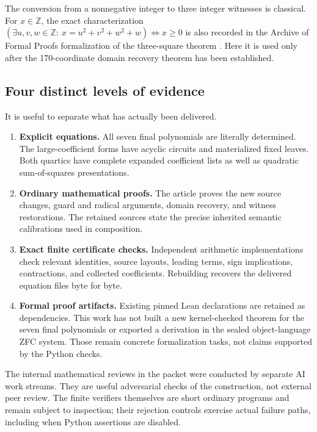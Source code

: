 \documentclass[11pt,a4paper]{article}
\theoremstyle{definition}
\begin{document}
The conversion from a nonnegative integer to three integer witnesses is
classical. For $x\in\mathbb Z$, the exact characterization
$(\exists u,v,w\in\mathbb Z:\ x=u^2+v^2+w^2+w)\Longleftrightarrow x\ge0$
is also recorded in the
Archive of Formal Proofs formalization of the three-square theorem
\cite{three-squares}. Here it is used only after the 170-coordinate domain
recovery theorem has been established.

\subsection{Four distinct levels of evidence}

It is useful to separate what has actually been delivered.
\begin{enumerate}
 \item \textbf{Explicit equations.} All seven final polynomials are
 literally determined. The large-coefficient forms have acyclic circuits
 and materialized fixed leaves. Both quartics have complete expanded
 coefficient lists as well as quadratic sum-of-squares presentations.
 \item \textbf{Ordinary mathematical proofs.} The article proves the
 new source changes, guard and radical arguments, domain recovery, and
 witness restorations. The retained sources state the precise inherited
 semantic calibrations used in composition.
 \item \textbf{Exact finite certificate checks.} Independent arithmetic
 implementations check relevant identities, source layouts, leading
 terms, sign implications, contractions, and collected coefficients.
 Rebuilding recovers the delivered equation files byte for byte.
 \item \textbf{Formal proof artifacts.} Existing pinned Lean declarations
 are retained as dependencies. This work has not built a new kernel-checked
 theorem for the seven final polynomials or exported a derivation in the
 sealed object-language ZFC system. Those remain concrete formalization
 tasks, not claims supported by the Python checks.
\end{enumerate}

The internal mathematical reviews in the packet were conducted by separate
AI work streams. They are useful adversarial checks of the construction,
not external peer review. The finite verifiers themselves are short
ordinary programs and remain subject to inspection; their rejection
controls exercise actual failure paths, including when Python assertions
are disabled.
\end{document}
